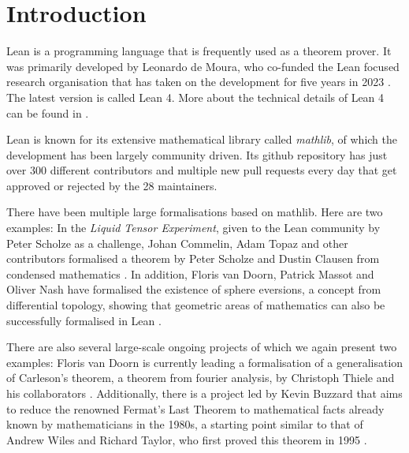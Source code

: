\chapter*{Introduction}

Lean is a programming language that is frequently used as a theorem prover. 
It was primarily developed by Leonardo de Moura, who co-funded the Lean focused research organisation that has taken on the development for five years in 2023 \cite{LeanFRO2024}. 
The latest version is called Lean 4.
More about the technical details of Lean 4 can be found in \cite{deMoura2021}.

Lean is known for its extensive mathematical library called \emph{mathlib}, of which the development has been largely community driven. 
Its github repository has just over 300 different contributors and multiple new pull requests every day that get approved or rejected by the 28 maintainers. 

There have been multiple large formalisations based on mathlib. 
Here are two examples: 
In the \emph{Liquid Tensor Experiment}, given to the Lean community by Peter Scholze as a challenge, Johan Commelin, Adam Topaz and other contributors formalised a theorem by Peter Scholze and Dustin Clausen from condensed mathematics \cite{Commelin2022}.
In addition, Floris van Doorn, Patrick Massot and Oliver Nash have formalised the existence of sphere eversions, a concept from differential topology, showing that geometric areas of mathematics can also be successfully formalised in Lean \cite{vanDoorn2023}. 

There are also several large-scale ongoing projects of which we again present two examples: 
Floris van Doorn is currently leading a formalisation of a generalisation of Carleson's theorem, a theorem from fourier analysis, by Christoph Thiele and his collaborators \cite{Becker2024}.
Additionally, there is a project led by Kevin Buzzard that aims to reduce the renowned Fermat's Last Theorem to mathematical facts already known by mathematicians in the 1980s, a starting point similar to that of Andrew Wiles and Richard Taylor, who first proved this theorem in 1995 \cite{Buzzard2024}.

